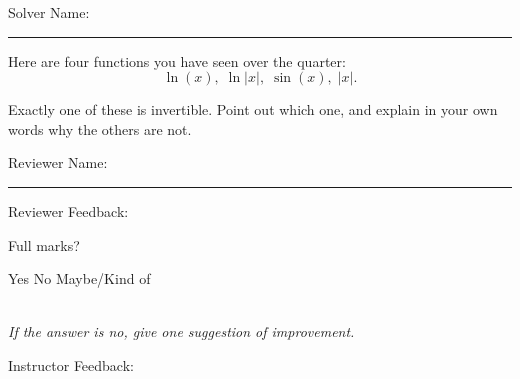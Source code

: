 \documentclass[12pt]{exam}
\begin{document}
\pagestyle{headandfoot}
\firstpageheadrule

Solver Name:\enspace\rule{5cm}{0.8pt}

\begin{questions}
\question

Here are four functions you have seen over the quarter:
\[\ln(x),\;\ln\lvert x\rvert,\;\sin(x),\;\lvert x\rvert.\]

Exactly one of these is invertible. Point out which one, and explain in your own words why the others are not.

\end{questions}

Reviewer Name:\enspace\rule{5cm}{0.8pt}

\begin{questions}
\question
Reviewer Feedback:

Full marks? \begin{oneparcheckboxes}
\choice Yes
\choice No
\choice Maybe/Kind of
\end{oneparcheckboxes}\\
\textit{If the answer is no, give one suggestion of improvement.}

\question

Instructor Feedback:

\end{questions}
\end{document}
